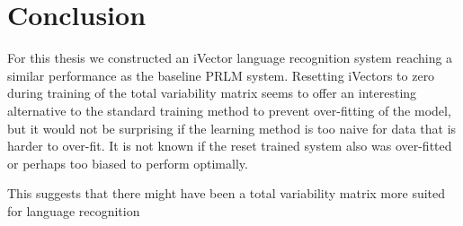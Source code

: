 \chapter{Conclusion}

For this thesis we constructed an iVector language recognition system reaching a similar performance as the baseline PRLM system. Resetting iVectors to zero during training of the total variability matrix seems to offer an interesting alternative to the standard training method to prevent over-fitting of the model, but it would not be surprising if the learning method is too naive for data that is harder to over-fit. It is not known if the reset trained system also was over-fitted or perhaps too biased to perform optimally. 


This suggests that there might have been a total variability matrix more suited for language recognition













